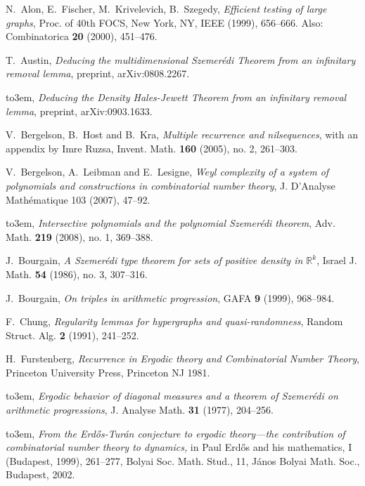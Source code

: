 \documentclass[11pt,reqno]{amsart}
\numberwithin{equation}{section}
\theoremstyle{plain}
\theoremstyle{definition}
\newcommand\R{\mathbb{R}}
\newcommand\1{{\bf 1}}
\newcommand\2{{\bf 2}}
\begin{document}
\providecommand{\bysame}{\leavevmode\hbox to3em{\hrulefill}\thinspace}
\begin{thebibliography}{99}

N.~Alon, E.~Fischer, M.~Krivelevich, B.~Szegedy, \emph{Efficient
testing of large graphs}, Proc. of 40th FOCS, New York, NY, IEEE (1999), 656--666. Also: Combinatorica \textbf{20} (2000), 451--476.

T.~Austin, \emph{Deducing the multidimensional Szemer\'edi Theorem from an infinitary removal lemma}, preprint, arXiv:0808.2267.

\bysame, \emph{Deducing the Density Hales-Jewett Theorem from an infinitary removal lemma}, preprint, arXiv:0903.1633.

V.~Bergelson, B.~Host and B.~Kra, \emph{Multiple recurrence and nilsequences}, with an appendix by Imre Ruzsa, Invent. Math. \textbf{160} (2005), no. 2, 261--303.

V.~Bergelson,  A.~Leibman and E.~Lesigne, \emph{Weyl complexity of a system of polynomials and constructions in combinatorial number theory}, J. D'Analyse Math\'ematique 103 (2007), 47--92. 

\bysame, \emph{Intersective polynomials and the polynomial Szemer\'edi theorem}, Adv. Math. \textbf{219} (2008), no. 1, 369--388.

J.~Bourgain, \emph{A Szemer\'edi type theorem for sets of positive density in $\R^k$}, {Israel J. Math.} \textbf{54} (1986), no. 3, 307--316.

J.~Bourgain, \emph{On triples in arithmetic progression}, {GAFA } \textbf{9} (1999), 968--984.

F.~Chung, \emph{Regularity lemmas for hypergraphs and quasi-randomness}, Random Struct. Alg. \textbf{2} (1991), 241--252.

H.~Furstenberg, {\it Recurrence in Ergodic theory and Combinatorial Number Theory}, Princeton University Press, Princeton NJ 1981.


 \bysame,
\emph{Ergodic behavior of diagonal measures and a theorem of Szemer\'edi on arithmetic progressions},
J. Analyse Math. \textbf{31} (1977), 204--256.

 \bysame, \emph{From the Erd\H{o}s-Tur\'an conjecture to ergodic theory---the contribution of combinatorial number theory to dynamics,} in Paul Erd\H{o}s and his mathematics, I (Budapest, 1999), 261--277, Bolyai Soc. Math. Stud., 11, J\'anos Bolyai Math. Soc., Budapest, 2002.



\end{thebibliography}
\end{document}
